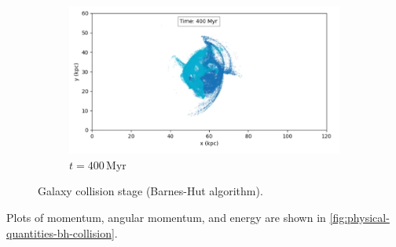 \begin{figure}[htp]
    \begin{subfigure}[b]{0.8\textwidth}
        \centering
        \includegraphics[width=\textwidth]{chapters/results/img/bh-collision/400myr.png}
        \caption{$t=400\,\text{Myr}$}
        \label{fig:collision-bh-sub3}
    \end{subfigure}

    \caption{Galaxy collision stage (Barnes-Hut algorithm).}
    \label{fig:collision-bh}
\end{figure}
Plots of momentum, angular momentum, and energy are shown in \autoref{fig:physical-quantities-bh-collision}.
